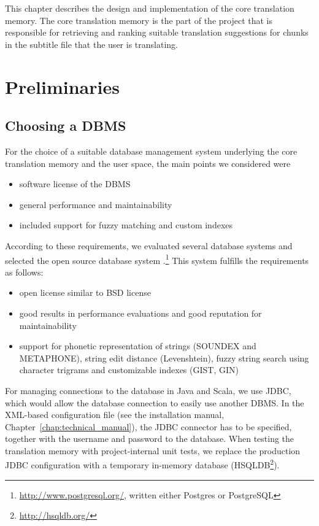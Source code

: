 This chapter describes the design and implementation of the core translation memory. The core translation memory is the part of the project that is responsible for retrieving and ranking suitable translation suggestions for chunks in the subtitle file that the user is translating.

\section{Preliminaries}

\subsection{Choosing a DBMS}
\label{sec:dbms}

For the choice of a suitable database management system underlying the
core translation memory and the user space, the main points we
considered were

\begin{itemize}
\item
  software license of the DBMS
\item
  general performance and maintainability
\item
  included support for fuzzy matching and custom indexes
\end{itemize}
According to these requirements, we evaluated several database systems
and selected the open source database system
\postgres.\footnote{\url{http://www.postgresql.org/}, written either Postgres or PostgreSQL} This system
fulfills the requirements as follows:

\begin{itemize}
\item
  open license similar to BSD license
\item
  good results in performance evaluations and good reputation for
  maintainability
\item
  support for phonetic representation of strings (SOUNDEX and
  METAPHONE), string edit distance (Levenshtein), fuzzy string search
  using character trigrams and customizable indexes (GIST, GIN)
\end{itemize}

For managing connections to the database in Java and Scala, we use JDBC, 
which would allow the database connection to easily use another DBMS. 
In the XML-based configuration file (see the installation manual, Chapter~\ref{chap:technical_manual}), the JDBC connector
has to be specified, together with the username and password to the database. When testing the
translation memory with project-internal unit tests, we replace the production JDBC
configuration with a temporary in-memory database (HSQLDB\footnote{\url{http://hsqldb.org/}}).

